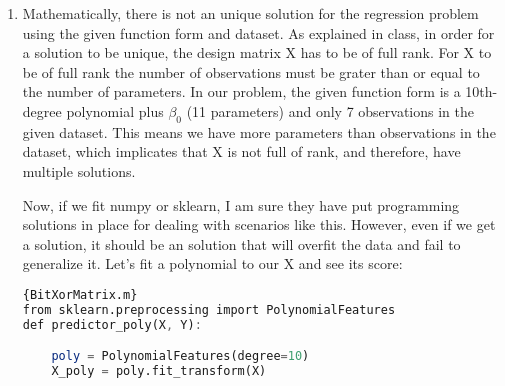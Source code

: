\documentclass{assignment}
\begin{document}
\begin{problem}
\begin{enumerate}[label=\alph*)]
\begin{lstlisting}[language=Octave]{BitXorMatrix.m}
y_pred_1_2 = predictor_1_2(X, Y)
score(Y, y_pred_1_2)
\end{lstlisting}
Solution 1-2: \\
$y = 8.19x$\\

The score for this solution is: \\
0.04\\

\begin{lstlisting}[language=Octave]{BitXorMatrix.m}
y_pred_1_3 = predictor_1_3(X, Y)
score(Y, y_pred_1_3)
\end{lstlisting}
Solution 1-3: \\
$y = -9.315x + 1.58x^2 + 12.419$\\

The score for this solution is: \\
0.881

My solution for the functions (1-2) and (1-3) has aligned with my previous answers for them.\\

    \item
    Mathematically, there is not an unique solution for the regression problem using the given function form and dataset. As explained in class, in order for a solution to be unique, the design matrix X has to be of full rank. For X to be of full rank the number of observations must be grater than or equal to the number of parameters. In our problem, the given function form is a 10th-degree polynomial plus $\beta_0$ (11 parameters) and only 7 observations in the given dataset. This means we have more parameters than observations in the dataset, which implicates that X is not full of rank, and therefore, have multiple solutions. 

    Now, if we fit numpy or sklearn, I am sure they have put programming solutions in place for dealing with scenarios like this. However, even if we get a solution, it should be an solution that will overfit the data and fail to generalize it. Let's fit a polynomial to our X and see its score:\\

\begin{lstlisting}[language=Octave]{BitXorMatrix.m}
from sklearn.preprocessing import PolynomialFeatures
def predictor_poly(X, Y): 

    poly = PolynomialFeatures(degree=10)
    X_poly = poly.fit_transform(X)
    

\end{lstlisting}
\end{enumerate}
\end{problem}
\end{document}
